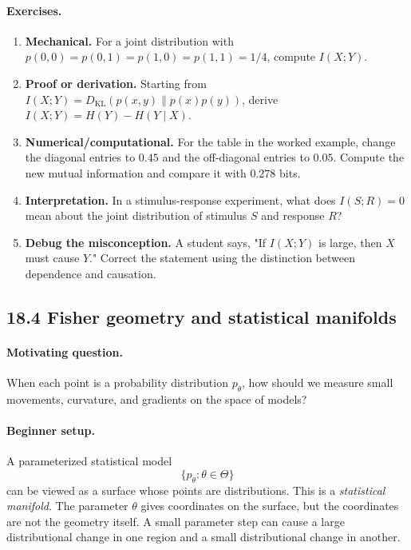 \paragraph{Exercises.}
\begin{enumerate}[label=\textbf{18.3.\arabic*.}, leftmargin=*]
\item \textbf{Mechanical.} For a joint distribution with \(p(0,0)=p(0,1)=p(1,0)=p(1,1)=1/4\), compute \(I(X;Y)\).
\item \textbf{Proof or derivation.} Starting from \(I(X;Y)=D_{\mathrm{KL}}(p(x,y)\|p(x)p(y))\), derive \(I(X;Y)=H(Y)-H(Y\mid X)\).
\item \textbf{Numerical/computational.} For the table in the worked example, change the diagonal entries to \(0.45\) and the off-diagonal entries to \(0.05\). Compute the new mutual information and compare it with \(0.278\) bits.
\item \textbf{Interpretation.} In a stimulus-response experiment, what does \(I(S;R)=0\) mean about the joint distribution of stimulus \(S\) and response \(R\)?
\item \textbf{Debug the misconception.} A student says, "If \(I(X;Y)\) is large, then \(X\) must cause \(Y\)." Correct the statement using the distinction between dependence and causation.
\end{enumerate}

\subsection{18.4 Fisher geometry and statistical manifolds}

\paragraph{Motivating question.}
When each point is a probability distribution \(p_\theta\), how should we measure small movements, curvature, and gradients on the space of models?

\paragraph{Beginner setup.}
A parameterized statistical model
\[
\{p_\theta:\theta\in\Theta\}
\]
can be viewed as a surface whose points are distributions. This is a \emph{statistical manifold}. The parameter \(\theta\) gives coordinates on the surface, but the coordinates are not the geometry itself. A small parameter step can cause a large distributional change in one region and a small distributional change in another.

